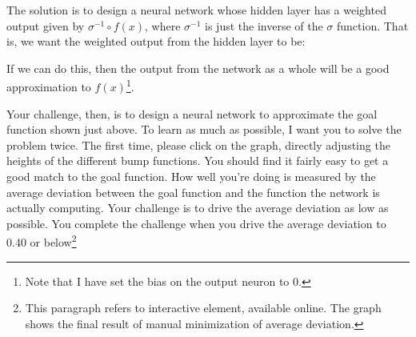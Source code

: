\documentclass[a4paper,twoside,10pt]{book}
\begin{document}
The solution is to design a neural network whose hidden layer has a weighted output given by $\sigma^{-1} \circ f(x)$, where $\sigma^{-1}$ is just the inverse of the $\sigma$ function. That is, we want the weighted output from the hidden layer to be:
\begin{center} 
\end{center}
If we can do this, then the output from the network as a whole will be a good approximation to $f(x)$\footnote{Note that I have set the bias on the output neuron to 0.}.

Your challenge, then, is to design a neural network to approximate the goal function shown just above. To learn as much as possible, I want you to solve the problem twice. The first time, please click on the graph, directly adjusting the heights of the different bump functions. You should find it fairly easy to get a good match to the goal function. How well you're doing is measured by the average deviation between the goal function and the function the network is actually computing. Your challenge is to drive the average deviation as low as possible. You complete the challenge when you drive the average deviation to 0.40 or below\footnote{This paragraph refers to interactive element, available online. The graph shows the final result of manual minimization of average deviation. }
\end{document}
